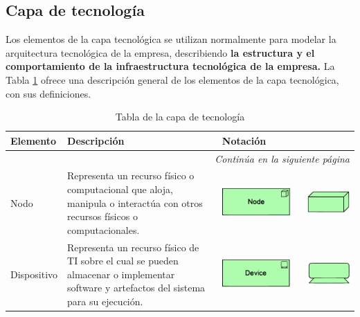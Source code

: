 

\subsection{Capa de tecnología}

Los elementos de la capa tecnológica se utilizan normalmente para modelar la arquitectura tecnológica de la empresa, describiendo \textbf{la estructura y el comportamiento de la infraestructura tecnológica de la empresa.}
La Tabla \ref{tab:Tabla de la capa de tecnología} ofrece una descripción general de los elementos de la capa tecnológica, con sus definiciones.\cite{archimate} 
\begin{longtable}{|p{0.15\linewidth}|p{0.45\linewidth}|p{0.4\linewidth} |}
    \caption{Tabla de la capa de tecnología}
    \\
    \hline
    \rowcolor[HTML]{AFC5F6} 
    \textbf{Elemento} & \textbf{Descripción} & \textbf{Notación} \\
    \hline
    \endhead
    \hline
    \multicolumn{3}{r}{\textit{Continúa en la siguiente página}} \\
    \endfoot
    \hline
    \endlastfoot
    \label{tab:Tabla de la capa de tecnología}



    Nodo
    &
    Representa un recurso físico o computacional 
        que aloja, manipula o interactúa con otros 
        recursos físicos o computacionales.
    &
\begin{center}
    \includegraphics[width=0.8\linewidth]{imgs/capa_tecnologia/Node.pdf}
\end{center} 
    \\ \hline



    Dispositivo
    &
    Representa un recurso físico de TI sobre el cual 
    se pueden almacenar o implementar software y 
    artefactos del sistema para su ejecución.
    &
\begin{center}
    \includegraphics[width=0.8\linewidth]{imgs/capa_tecnologia/Device.pdf}
\end{center} 
    \\ \hline




\end{longtable}
